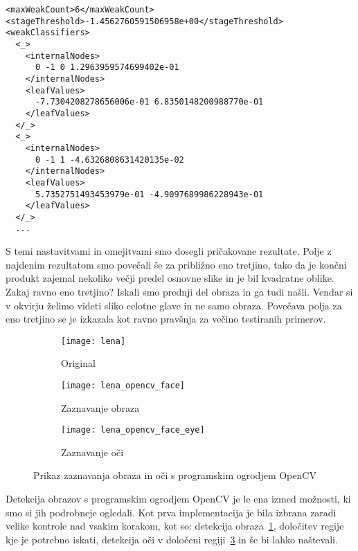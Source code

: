 \begin{lstlisting}[label=lst:haar_eye, caption=Izsek iz datoteke harrcascade\_eye.xml]
<maxWeakCount>6</maxWeakCount>
<stageThreshold>-1.4562760591506958e+00</stageThreshold>
<weakClassifiers>
  <_>
    <internalNodes>
      0 -1 0 1.2963959574699402e-01
    </internalNodes>
    <leafValues>
      -7.7304208278656006e-01 6.8350148200988770e-01
    </leafValues>
  </_>
  <_>
    <internalNodes>
      0 -1 1 -4.6326808631420135e-02
    </internalNodes>
    <leafValues>
      5.7352751493453979e-01 -4.9097689986228943e-01
    </leafValues>
  </_>
  ...
\end{lstlisting}

S temi nastavitvami in omejitvami smo dosegli pričakovane rezultate. Polje z
najdenim rezultatom smo povečali še za približno eno tretjino, tako da je
končni produkt zajemal nekoliko večji predel osnovne slike in je bil kvadratne
oblike. Zakaj ravno eno tretjino? Iskali smo prednji del obraza in ga tudi
našli. Vendar si v okvirju želimo videti sliko celotne glave in ne samo
obraza. Povečava polja za eno tretjino se je izkazala kot ravno pravšnja za
večino testiranih primerov.

\begin{figure}[!ht]
    \centering
    \begin{subfigure}[b]{0.3\textwidth}
        \texttt{[image: lena]}
        \caption{Original}
    \end{subfigure}
    \begin{subfigure}[b]{0.3\textwidth}
        \texttt{[image: lena\_opencv\_face]}
        \caption{Zaznavanje obraza}
        \label{fig:lena_opencv_face}
    \end{subfigure}
    \begin{subfigure}[b]{0.3\textwidth}
        \texttt{[image: lena\_opencv\_face\_eye]}
        \caption{Zaznavanje oči}
        \label{fig:lena_opencv_face_eye}
    \end{subfigure}
    \caption{Prikaz zaznavanja obraza in oči s programskim ogrodjem OpenCV}
\end{figure}

Detekcija obrazov s programskim ogrodjem OpenCV je le ena izmed možnosti, ki
smo si jih podrobneje ogledali. Kot prva implementacija je bila izbrana zaradi
velike kontrole nad vsakim korakom, kot so: detekcija
obraza~\ref{fig:lena_opencv_face}, določitev regije kje je potrebno iskati,
detekcija oči v določeni regiji~\ref{fig:lena_opencv_face_eye} in še bi lahko
naštevali.

